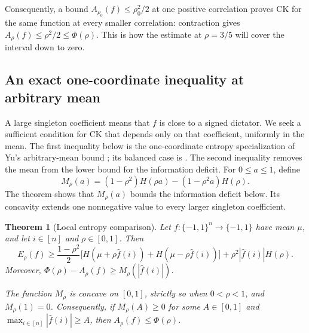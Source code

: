 \documentclass[11pt,letterpaper]{amsart}
\newcommand{\1}{\mathbf 1}
\newtheorem{theorem}{Theorem}[section]
\numberwithin{equation}{section}
\begin{document}
Consequently, a bound $A_{\rho_0}(f)\le\rho_0^2/2$ at one positive
correlation proves CK for the same function at every smaller correlation:
contraction gives $A_\rho(f)\le\rho^2/2\le\Phi(\rho)$. This is how
the estimate at $\rho=3/5$ will cover the interval down to zero.

\subsection{An exact one-coordinate inequality at arbitrary mean}

A large singleton coefficient means that $f$ is close to a signed
dictator. We seek a sufficient condition for CK that depends only on
that coefficient, uniformly in the mean. The first inequality below
is the one-coordinate entropy specialization of Yu's arbitrary-mean
bound \cite[Theorem~6.2]{Yu2026Local}; its balanced case is
\cite[Theorem~4.6 and Remark~4.7]{Yu2026Local}. The second inequality
removes the mean from the lower bound for the information deficit.
For $0\le a\le1$, define
\begin{equation}\label{eq:local-deficit}
 M_\rho(a)=(1-\rho^2)H(\rho a)-(1-\rho^2a)H(\rho).
\end{equation}
The theorem shows that $M_\rho(a)$ bounds the information deficit
below. Its concavity extends one nonnegative value to every larger
singleton coefficient.

\begin{theorem}[Local entropy comparison]\label{ub:local}
Let $f:\{-1,1\}^n\to\{-1,1\}$ have mean $\mu$,
and let $i\in[n]$ and $\rho\in[0,1]$. Then
\[
 E_\rho(f)\ge\frac{1-\rho^2}{2}
 \bigl[H(\mu+\rho\widehat f(i))+H(\mu-\rho\widehat f(i))\bigr]
 +\rho^2|\widehat f(i)|H(\rho).
\]
Moreover, $\Phi(\rho)-A_\rho(f)\ge M_\rho(|\widehat f(i)|)$.

The function $M_\rho$ is concave on $[0,1]$, strictly so
when $0<\rho<1$, and $M_\rho(1)=0$.
Consequently, if $M_\rho(A)\ge0$ for some $A\in[0,1]$
and $\max_{i\in[n]}|\widehat f(i)|\ge A$,
then $A_\rho(f)\le\Phi(\rho)$.
\end{theorem}
\end{document}
